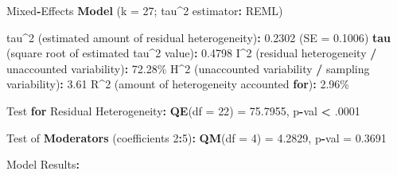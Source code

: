 \documentclass[
]{book}
\newenvironment{Shaded}{\begin{snugshade}}{\end{snugshade}}
\newcommand{\AttributeTok}[1]{\textcolor[rgb]{0.13,0.29,0.53}{#1}}
\newcommand{\ControlFlowTok}[1]{\textcolor[rgb]{0.13,0.29,0.53}{\textbf{#1}}}
\newcommand{\DecValTok}[1]{\textcolor[rgb]{0.00,0.00,0.81}{#1}}
\newcommand{\FloatTok}[1]{\textcolor[rgb]{0.00,0.00,0.81}{#1}}
\newcommand{\FunctionTok}[1]{\textcolor[rgb]{0.13,0.29,0.53}{\textbf{#1}}}
\newcommand{\NormalTok}[1]{#1}
\newcommand{\OtherTok}[1]{\textcolor[rgb]{0.56,0.35,0.01}{#1}}
\newcommand{\SpecialCharTok}[1]{\textcolor[rgb]{0.81,0.36,0.00}{\textbf{#1}}}
\begin{document}
\begin{Shaded}
\begin{Highlighting}[]
\NormalTok{Mixed}\SpecialCharTok{{-}}\NormalTok{Effects }\FunctionTok{Model}\NormalTok{ (}\AttributeTok{k =} \DecValTok{27}\NormalTok{; tau}\SpecialCharTok{\^{}}\DecValTok{2}\NormalTok{ estimator}\SpecialCharTok{:}\NormalTok{ REML)}

\NormalTok{tau}\SpecialCharTok{\^{}}\DecValTok{2}\NormalTok{ (estimated amount of residual heterogeneity)}\SpecialCharTok{:}     \FloatTok{0.2302}\NormalTok{ (}\AttributeTok{SE =} \FloatTok{0.1006}\NormalTok{)}
\FunctionTok{tau}\NormalTok{ (square root of estimated tau}\SpecialCharTok{\^{}}\DecValTok{2}\NormalTok{ value)}\SpecialCharTok{:}             \FloatTok{0.4798}
\NormalTok{I}\SpecialCharTok{\^{}}\DecValTok{2}\NormalTok{ (residual heterogeneity }\SpecialCharTok{/}\NormalTok{ unaccounted variability)}\SpecialCharTok{:} \FloatTok{72.28}\NormalTok{\%}
\NormalTok{H}\SpecialCharTok{\^{}}\DecValTok{2}\NormalTok{ (unaccounted variability }\SpecialCharTok{/}\NormalTok{ sampling variability)}\SpecialCharTok{:}   \FloatTok{3.61}
\NormalTok{R}\SpecialCharTok{\^{}}\DecValTok{2}\NormalTok{ (amount of heterogeneity accounted }\ControlFlowTok{for}\NormalTok{)}\SpecialCharTok{:}            \FloatTok{2.96}\NormalTok{\%}

\NormalTok{Test }\ControlFlowTok{for}\NormalTok{ Residual Heterogeneity}\SpecialCharTok{:}
\FunctionTok{QE}\NormalTok{(}\AttributeTok{df =} \DecValTok{22}\NormalTok{) }\OtherTok{=} \FloatTok{75.7955}\NormalTok{, p}\SpecialCharTok{{-}}\NormalTok{val }\SpecialCharTok{\textless{}}\NormalTok{ .}\DecValTok{0001}

\NormalTok{Test of }\FunctionTok{Moderators}\NormalTok{ (coefficients }\DecValTok{2}\SpecialCharTok{:}\DecValTok{5}\NormalTok{)}\SpecialCharTok{:}
\FunctionTok{QM}\NormalTok{(}\AttributeTok{df =} \DecValTok{4}\NormalTok{) }\OtherTok{=} \FloatTok{4.2829}\NormalTok{, p}\SpecialCharTok{{-}}\NormalTok{val }\OtherTok{=} \FloatTok{0.3691}

\NormalTok{Model Results}\SpecialCharTok{:}


\end{Highlighting}
\end{Shaded}
\end{document}
